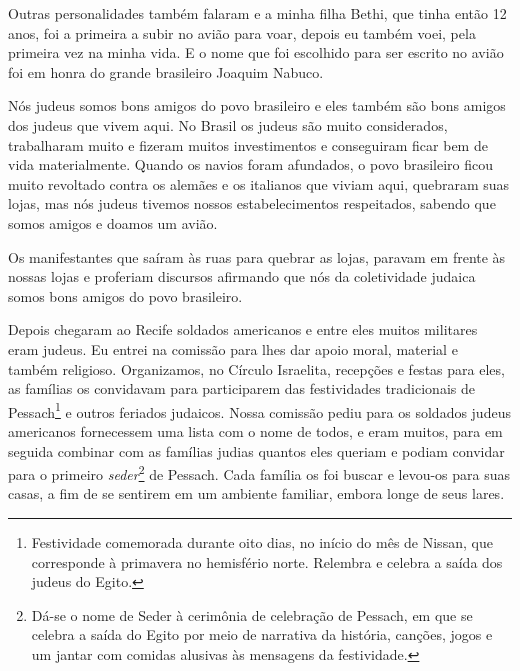 Outras personalidades também falaram e a minha filha Bethi, que tinha
então 12 anos, foi a primeira a subir no avião para voar, depois eu
também voei, pela primeira vez na minha vida. E o nome que foi escolhido
para ser escrito no avião foi em honra do grande brasileiro Joaquim
Nabuco.

Nós judeus somos bons amigos do povo brasileiro e eles também são bons
amigos dos judeus que vivem aqui. No Brasil os judeus são muito
considerados, trabalharam muito e fizeram muitos investimentos e
conseguiram ficar bem de vida materialmente. Quando os navios foram
afundados, o povo brasileiro ficou muito revoltado contra os alemães e
os italianos que viviam aqui, quebraram suas lojas, mas nós judeus
tivemos nossos estabelecimentos respeitados, sabendo que somos amigos e
doamos um avião.

Os manifestantes que saíram às ruas para quebrar as lojas, paravam em
frente às nossas lojas e proferiam discursos afirmando que nós da
coletividade judaica somos bons amigos do povo brasileiro.

Depois chegaram ao Recife soldados americanos e entre eles muitos
militares eram judeus. Eu entrei na comissão para lhes dar apoio moral,
material e também religioso. Organizamos, no Círculo Israelita,
recepções e festas para eles, as famílias os convidavam para
participarem das festividades tradicionais de Pessach\footnote{Festividade
  comemorada durante oito dias, no início do mês de Nissan, que
  corresponde à primavera no hemisfério norte. Relembra e celebra a
  saída dos judeus do Egito.} e outros feriados judaicos. Nossa comissão
pediu para os soldados judeus americanos fornecessem uma lista com o
nome de todos, e eram muitos, para em seguida combinar com as famílias
judias quantos eles queriam e podiam convidar para o primeiro
\textit{seder}\footnote{Dá-se o nome de Seder à cerimônia de celebração de
  Pessach, em que se celebra a saída do Egito por meio de narrativa da
  história, canções, jogos e um jantar com comidas alusivas às mensagens
  da festividade.} de Pessach. Cada família os foi buscar e levou-os
para suas casas, a fim de se sentirem em um ambiente familiar, embora
longe de seus lares.

